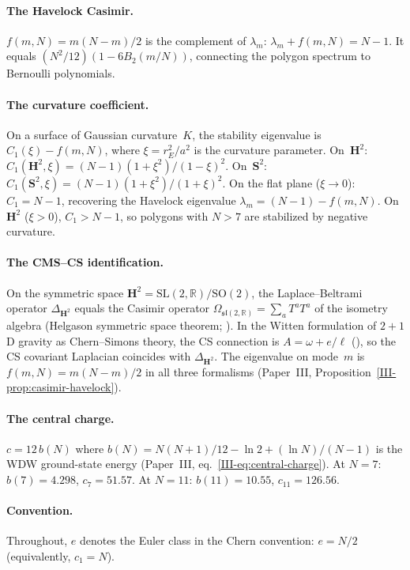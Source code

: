 \paragraph{The Havelock Casimir.}
$f(m,N) = m(N{-}m)/2$ is the complement of $\lambda_m$:
$\lambda_m + f(m,N) = N{-}1$.
It equals $(N^2/12)(1 - 6B_2(m/N))$,
connecting the polygon spectrum to Bernoulli polynomials.

\paragraph{The curvature coefficient.}
On a surface of Gaussian curvature~$K$, the stability eigenvalue is
$C_1(\xi) - f(m,N)$, where $\xi = r_E^2/a^2$ is the curvature
parameter.
On~$\mathbf{H}^2$:
$C_1(\mathbf{H}^2, \xi) = (N{-}1)(1{+}\xi^2)/(1{-}\xi)^2$.
On~$\mathbf{S}^2$:
$C_1(\mathbf{S}^2, \xi) = (N{-}1)(1{+}\xi^2)/(1{+}\xi)^2$.
On the flat plane ($\xi \to 0$): $C_1 = N{-}1$,
recovering the Havelock eigenvalue $\lambda_m = (N{-}1) - f(m,N)$.
On~$\mathbf{H}^2$ ($\xi > 0$), $C_1 > N{-}1$,
so polygons with $N > 7$ are stabilized by negative curvature.

\paragraph{The CMS--CS identification.}
On the symmetric space
$\mathbf{H}^2 = \mathrm{SL}(2,\mathbb{R})/\mathrm{SO}(2)$,
the Laplace--Beltrami operator $\Delta_{\mathbf{H}^2}$
equals the Casimir operator
$\Omega_{\mathfrak{sl}(2,\mathbb{R})} = \sum_a T^a T^a$
of the isometry algebra
(Helgason symmetric space theorem;
\citealt{Helgason1984}).
In the Witten formulation of $2{+}1$D gravity as
Chern--Simons theory, the CS connection is
$A = \omega + e/\ell$ (\citealt{Witten1988}),
so the CS covariant Laplacian coincides with
$\Delta_{\mathbf{H}^2}$.
The eigenvalue on mode~$m$ is $f(m,N) = m(N{-}m)/2$
in all three formalisms
(Paper~III, Proposition~\ref*{III-prop:casimir-havelock}).

\paragraph{The central charge.}
$c = 12\,b(N)$ where
$b(N) = N(N{+}1)/12 - \ln 2 + (\ln N)/(N{-}1)$
is the WDW ground-state energy
(Paper~III, eq.~\ref*{III-eq:central-charge}).
At $N = 7$: $b(7) = 4.298$, $c_7 = 51.57$.
At $N = 11$: $b(11) = 10.55$, $c_{11} = 126.56$.

\paragraph{Convention.}
Throughout, $e$ denotes the Euler class in the Chern convention:
$e = N/2$ (equivalently, $c_1 = N$).

